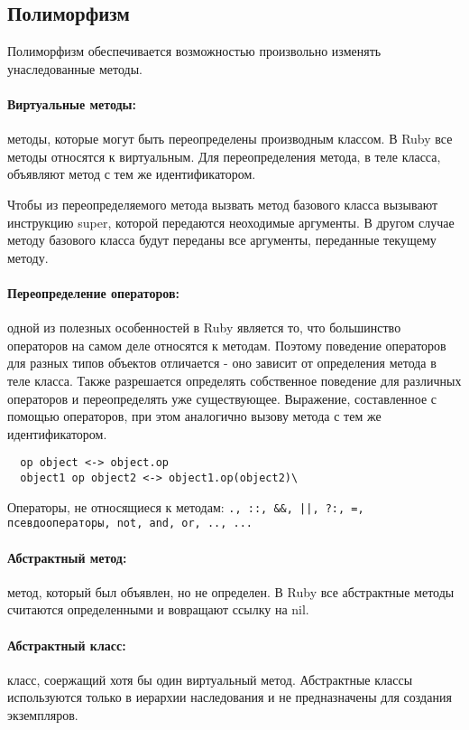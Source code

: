\subsection{Полиморфизм}

Полиморфизм обеспечивается возможностью произвольно изменять унаследованные методы.

\paragraph*{Виртуальные методы:} методы, которые могут быть переопределены производным классом. В Ruby все методы относятся к виртуальным. Для переопределения метода, в теле класса, объявляют метод с тем же идентификатором. 

Чтобы из переопределяемого метода вызвать метод базового класса вызывают инструкцию super, которой передаются неоходимые аргументы. В другом случае методу базового класса будут переданы все аргументы, переданные текущему методу.

\paragraph*{Переопределение операторов:} одной из полезных особенностей в Ruby является то, что большинство операторов на самом деле относятся к методам. Поэтому поведение операторов для разных типов объектов отличается - оно зависит от определения метода в теле класса. Также разрешается определять собственное поведение для различных операторов и переопределять уже существующее. Выражение, составленное с помощью операторов, при этом аналогично вызову метода с тем же идентификатором.
\begin{verbatim}
  op object <-> object.op
  object1 op object2 <-> object1.op(object2)\
\end{verbatim}
Операторы, не относящиеся к методам:
\verb!., ::, &&, ||, ?:, =, псевдооператоры, not, and, or, .., ... !

\paragraph*{Абстрактный метод:} метод, который был объявлен, но не определен. В Ruby все абстрактные методы считаются определенными и вовращают ссылку на nil.

\paragraph*{Абстрактный класс:} класс, соержащий хотя бы один виртуальный метод. Абстрактные классы используются только в иерархии наследования и не предназначены для создания экземпляров.

